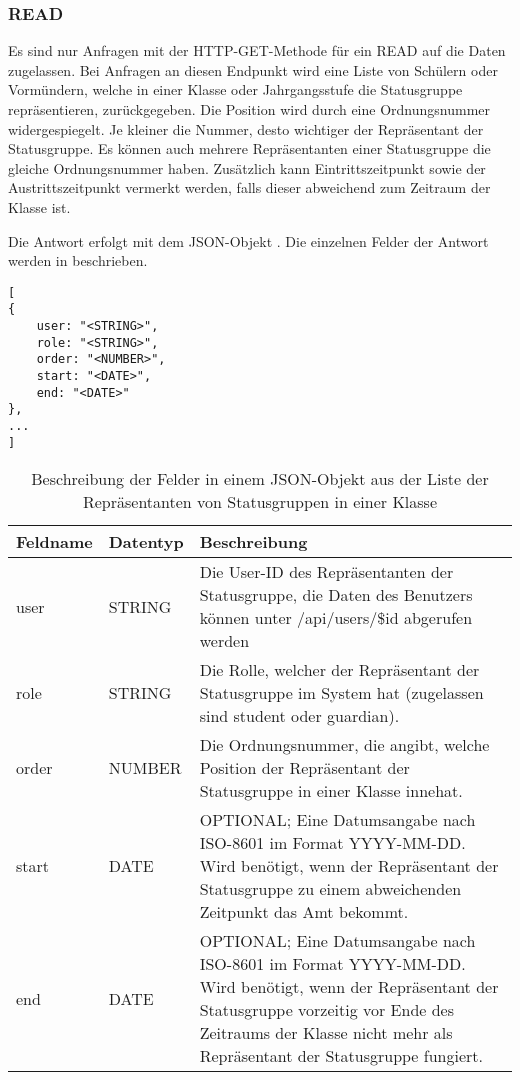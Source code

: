 \subsubsection{READ}
\label{sec:rest:api:classes:id:representatives:read}
Es sind nur Anfragen mit der HTTP-GET-Methode für ein READ auf die Daten zugelassen.
Bei Anfragen an diesen Endpunkt wird eine Liste von Schülern oder Vormündern, welche in einer Klasse oder Jahrgangsstufe die Statusgruppe repräsentieren, zurückgegeben.
Die Position wird durch eine Ordnungsnummer widergespiegelt. Je kleiner die Nummer, desto wichtiger der Repräsentant der Statusgruppe.
Es können auch mehrere Repräsentanten einer Statusgruppe die gleiche Ordnungsnummer haben.
Zusätzlich kann Eintrittszeitpunkt sowie der Austrittszeitpunkt vermerkt werden, falls dieser abweichend zum Zeitraum der Klasse ist.

Die Antwort erfolgt mit dem JSON-Objekt . 
Die einzelnen Felder der Antwort werden in  beschrieben.

\begin{lstlisting}[caption={JSON-Antwort für einen GET-Aufruf des Pfads /api/classes/\$id/representatives},label={lst:code:rest:api:classes:id:representatives:read:ret},frame=tlrb]
[ 
{ 
	user: "<STRING>",
	role: "<STRING>",
	order: "<NUMBER>",
  	start: "<DATE>",
  	end: "<DATE>"
},
... 
]
\end{lstlisting}

\begin{longtable}{|p{}|p{}|p{}|}
		\caption{Beschreibung der Felder in einem JSON-Objekt aus der Liste der Repräsentanten von Statusgruppen in einer Klasse}
\endfoot
		\caption{Beschreibung der Felder in einem JSON-Objekt aus der Liste der Repräsentanten von Statusgruppen in einer Klasse}
		\label{tab:rest:api:classes:id:representatives:read:ret}
\endlastfoot 
\hline
			\textbf{Feldname} & \textbf{Datentyp} & \textbf{Beschreibung} \\ \hline
\endhead
user & STRING & Die User-ID des Repräsentanten der Statusgruppe, die Daten des Benutzers können unter /api/users/\$id abgerufen werden \\ \hline
role & STRING & Die Rolle, welcher der Repräsentant der Statusgruppe im System hat (zugelassen sind student oder guardian). \\ \hline
order & NUMBER & Die Ordnungsnummer, die angibt, welche Position der Repräsentant der Statusgruppe in einer Klasse innehat. \\ \hline
start & DATE & OPTIONAL; Eine Datumsangabe nach ISO-8601 im Format YYYY-MM-DD. Wird benötigt, wenn der Repräsentant der Statusgruppe zu einem abweichenden Zeitpunkt das Amt bekommt. \\ \hline
end & DATE & OPTIONAL; Eine Datumsangabe nach ISO-8601 im Format YYYY-MM-DD. Wird benötigt, wenn der Repräsentant der Statusgruppe vorzeitig vor Ende des Zeitraums der Klasse nicht mehr als Repräsentant der Statusgruppe fungiert. \\ \hline
\end{longtable}
